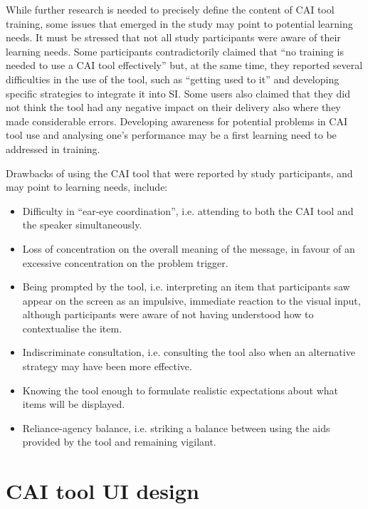 While further research is needed to precisely define the content of CAI tool training, some issues that emerged in the study may point to potential learning needs. It must be stressed that not all study participants were aware of their learning needs. Some participants contradictorily claimed that ``no training is needed to use a CAI tool effectively'' but, at the same time, they reported several difficulties in the use of the tool, such as ``getting used to it'' and developing specific strategies to integrate it into SI. Some users also claimed that they did not think the tool had any negative impact on their delivery also where they made considerable errors. Developing awareness for potential problems in CAI tool use and analysing one’s performance may be a first learning need to be addressed in training.

Drawbacks of using the CAI tool that were reported by study participants, and may point to learning needs, include:
\begin{itemize}
    \item Difficulty in ``ear-eye coordination'', i.e. attending to both the CAI tool and the speaker simultaneously.
\item Loss of concentration on the overall meaning of the message, in favour of an excessive concentration on the problem trigger.
\item Being prompted by the tool, i.e. interpreting an item that participants saw appear on the screen as an impulsive, immediate reaction to the visual input, although participants were aware of not having understood how to contextualise the item.
\item Indiscriminate consultation, i.e. consulting the tool also when an alternative strategy may have been more effective.
\item Knowing the tool enough to formulate realistic expectations about what items will be displayed.
\item Reliance-agency balance, i.e. striking a balance between using the aids provided by the tool and remaining vigilant.
\end{itemize}












\section{CAI tool UI design}

